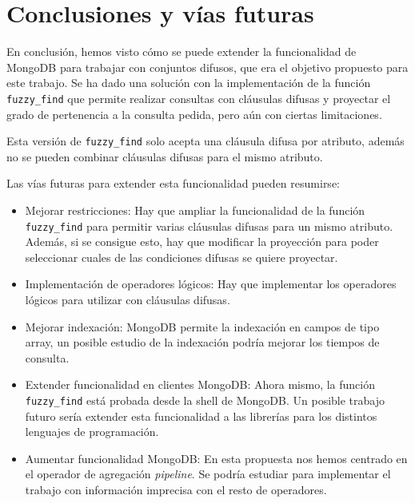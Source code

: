 \section{Conclusiones y vías futuras}

En conclusión, hemos visto cómo se puede extender la funcionalidad de MongoDB para trabajar con conjuntos difusos, que era el objetivo propuesto para este trabajo. Se ha dado una solución con la implementación de la función \texttt{fuzzy\_find} que permite realizar consultas con cláusulas difusas y proyectar el grado de pertenencia a la consulta pedida, pero aún con ciertas limitaciones.

Esta versión de \texttt{fuzzy\_find} solo acepta una cláusula difusa por atributo, además no se pueden combinar cláusulas difusas para el mismo atributo.

Las vías futuras para extender esta funcionalidad pueden resumirse:

\begin{itemize}
    \item Mejorar restricciones: Hay que ampliar la funcionalidad de la función \texttt{fuzzy\_find} para permitir varias cláusulas difusas para un mismo atributo. Además, si se consigue esto, hay que modificar la proyección para poder seleccionar cuales de las condiciones difusas se quiere proyectar.
    \item Implementación de operadores lógicos: Hay que implementar los operadores lógicos para utilizar con cláusulas difusas.
    \item Mejorar indexación: MongoDB permite la indexación en campos de tipo array, un posible estudio de la indexación podría mejorar los tiempos de consulta.
    \item Extender funcionalidad en clientes MongoDB: Ahora mismo, la función \texttt{fuzzy\_find} está probada desde la shell de MongoDB. Un posible trabajo futuro sería extender esta funcionalidad a las librerías para los distintos lenguajes de programación.
    \item Aumentar funcionalidad MongoDB: En esta propuesta nos hemos centrado en el operador de agregación \textit{pipeline}. Se podría estudiar para implementar el trabajo con información imprecisa con el resto de operadores.
\end{itemize}
